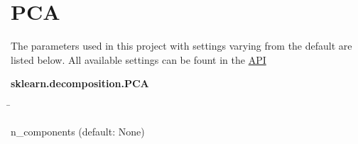 \section{PCA} \label{sec:PCA}

\blindtext
\autocite{pedregosa_scikit-learn_2011}
\autocite{jolliffe_principal_2016}
\autocite{pearson_liii_1901}
\autocite{jolliffe_principal_2016}

The parameters used in this project with settings varying from the default are listed below. All available settings can be fount in the
\href{https://scikit-learn.org/stable/modules/generated/sklearn.decomposition.PCA.html}{API}

\begin{leftbar}
    \textbf{sklearn.decomposition.PCA}
    \begin{nstabbing}
        \qquad\qquad\qquad\qquad\qquad\quad\=\kill

        n\_components \> (default: None)
    \end{nstabbing}
\end{leftbar}